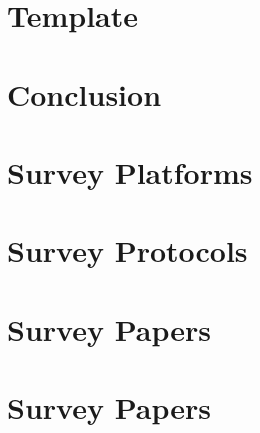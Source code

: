 \documentclass[conference]{IEEEtran}
\begin{document}
\begin{refsection}
\chapter[07:''la patience fait fondre le marbre'' -- Amer]{Template}
\chapter[09:''Everything that has a beginning has an ending. Make your peace with that and all will be well'' - Jack Kornfield]{Conclusion}
\Appendix
\chapter[A:''In any conflict, discover the one who rubs his hands ... You'll see that it's never the one who fights !''  - Marc Roussel]{Survey Platforms}
	\onecolumn
\chapter[A:''In any conflict, discover the one who rubs his hands ... You'll see that it's never the one who fights !''  - Marc Roussel]{Survey Protocols}
	\onecolumn
\chapter[A:''In any conflict, discover the one who rubs his hands ... You'll see that it's never the one who fights !''  - Marc Roussel]{Survey Papers}
\chapter[A:''In any conflict, discover the one who rubs his hands ... You'll see that it's never the one who fights !''  - Marc Roussel]{Survey Papers}
		

\end{refsection}
\end{document}
